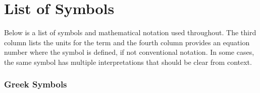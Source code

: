 \chapter*{List of Symbols}

Below is a list of symbols and mathematical notation used throughout. The third column lists the units for the term and the fourth column provides an equation number where the symbol is defined, if not conventional notation. In some cases, the same symbol has multiple interpretations that should be clear from context.

\subsection*{Greek Symbols}
